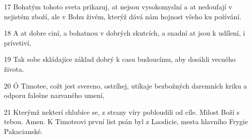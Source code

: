 \par 17 Bohatým tohoto sveta prikazuj, at nejsou vysokomyslní a at nedoufají v nejistém zboží, ale v Bohu živém, kterýž dává nám hojnost všeho ku požívání.
\par 18 A at dobre ciní, a bohatnou v dobrých skutcích, a snadní at jsou k udílení, i prívetiví,
\par 19 Tak sobe skládajíce základ dobrý k casu budoucímu, aby dosáhli vecného života.
\par 20 Ó Timotee, cožt jest svereno, ostríhej, utíkaje bezbožných daremních kriku a odporu falešne nazvaného umení,
\par 21 Kterýmž nekterí chlubíce se, z strany víry pobloudili od cíle. Milost Boží s tebou. Amen. K Timoteovi první list psán byl z Laodicie, mesta hlavního Frygie Pakacianské.


